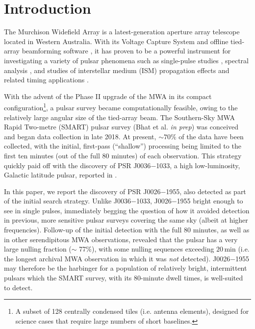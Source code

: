 \documentclass[twocolumn]{aastex631}
\newcommand{\psr}{J0026$-$1955}
\newcommand{\psrnick}{J0036$-$1033}
\newcommand{\nullfraction}{77\%}
\begin{document}
\section{Introduction} \label{sec:intro}

The Murchison Widefield Array \citep[MWA;][]{Tingay2013} is a latest-generation aperture array telescope located in Western Australia.
With its Voltage Capture System \citep[VCS;][]{Tremblay2015} and offline tied-array beamforming software \citep{Ord2019,McSweeney2020}, it has proven to be a powerful instrument for investigating a variety of pulsar phenomena such as single-pulse studies \citep{McSweeney2017}, spectral analysis \citep{Meyers2017}, and studies of interstellar medium (ISM) propagation effects and related timing applications \citep{Bhat2018,Kaur2019}.

With the advent of the Phase II upgrade of the MWA \citep{Wayth2018} in its compact configuration\footnote{A subset of 128 centrally condensed tiles (i.e. antenna elements), designed for science cases that require large numbers of short baselines.}, a pulsar survey became computationally feasible, owing to the relatively large angular size of the tied-array beam.
The Southern-Sky MWA Rapid Two-metre (SMART) pulsar survey (Bhat et al. \textit{in prep}) was conceived and began data collection in late 2018.
At present, $\sim70\%$ of the data have been collected, with the initial, first-pass (``shallow'') processing being limited to the first ten minutes (out of the full 80 minutes) of each observation.
This strategy quickly paid off with the discovery of PSR \psrnick{}, a high low-luminosity, Galactic latitude pulsar, reported in \citep{Swainston2021}.

In this paper, we report the discovery of PSR \psr{}, also detected as part of the initial search strategy.
Unlike \psrnick{}, \psr{} bright enough to see in single pulses, immediately begging the question of how it avoided detection in previous, more sensitive pulsar surveys covering the same sky (albeit at higher frequencies).
Follow-up of the initial detection with the full 80 minutes, as well as in other serendipitous MWA observations, revealed that the pulsar has a very large nulling fraction ($\sim$ \nullfraction{}), with some nulling sequences exceeding $20\,$min (i.e. the longest archival MWA observation in which it was \textit{not} detected).
\psr{} may therefore be the harbinger for a population of relatively bright, intermittent pulsars which the SMART survey, with its $80$-minute dwell times, is well-suited to detect.
\end{document}
